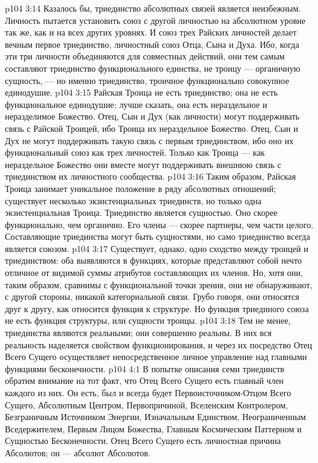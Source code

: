 \vs p104 3:14 \pc Казалось бы, триединство абсолютных связей является неизбежным. Личность пытается установить союз с другой личностью на абсолютном уровне так же, как и на всех других уровнях. И союз трех Райских личностей делает вечным первое триединство, личностный союз Отца, Сына и Духа. Ибо, когда эти три личности объединяются  для совместных действий, они тем самым составляют триединство функционального единства, не троицу --- органичную сущность, --- но именно триединство, троичное функционально совокупное единодушие.
\vs p104 3:15 Райская Троица не есть триединство; она не есть функциональное единодушие; лучше сказать, она есть нераздельное и неразделимое Божество. Отец, Сын и Дух (как личности) могут поддерживать связь с Райской Троицей, ибо Троица  их нераздельное Божество. Отец, Сын и Дух не могут поддерживать такую связь с первым триединством, ибо оно  их функциональный союз как трех личностей. Только как Троица --- как нераздельное Божество они вместе могут поддерживать внешнюю связь с триединством их личностного сообщества.
\vs p104 3:16 Таким образом, Райская Троица занимает уникальное положение в ряду абсолютных отношений; существует несколько экзистенциальных триединств, но только одна экзистенциальная Троица. Триединство  является сущностью. Оно скорее функционально, чем органично. Его члены --- скорее партнеры, чем части целого. Составляющие триединства могут быть сущностями, но само триединство всегда является союзом.
\vs p104 3:17 Существует, однако, одно сходство между троицей и триединством: оба выявляются в функциях, которые представляют собой нечто отличное от видимой суммы атрибутов составляющих их членов. Но, хотя они, таким образом, сравнимы с функциональной точки зрения, они не обнаруживают, с другой стороны, никакой категориальной связи. Грубо говоря, они относятся друг к другу, как относится функция к структуре. Но функция триединого союза не есть функция структуры, или сущности троицы.
\vs p104 3:18 Тем не менее, триединства являются реальными; они совершенно реальны. В них вся реальность наделяется свойством функционирования, и через их посредство Отец Всего Сущего осуществляет непосредственное личное управление над главными функциями бесконечности.
\vs p104 4:1 В попытке описания семи триединств обратим внимание на тот факт, что Отец Всего Сущего есть главный член каждого из них. Он есть, был и всегда будет Первоисточником\hyp{}Отцом Всего Сущего, Абсолютным Центром, Первопричиной, Вселенским Контролером, Безграничным Источником Энергии, Изначальным Единством, Неограниченным Вседержителем, Первым Лицом Божества, Главным Космическим Паттерном и Сущностью Бесконечности. Отец Всего Сущего есть личностная причина Абсолютов; он --- абсолют Абсолютов.
